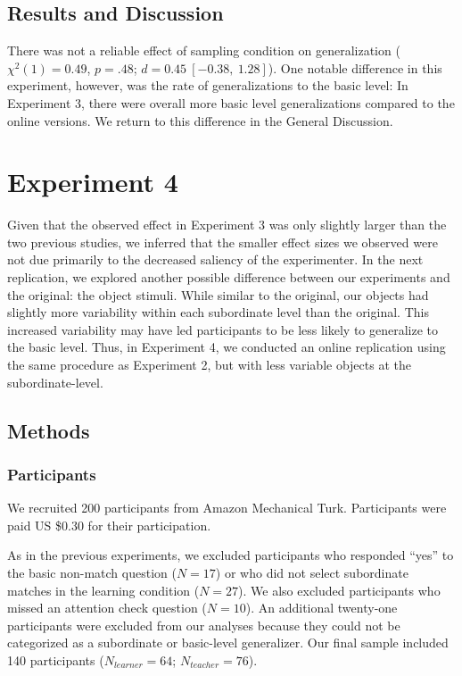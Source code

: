 \documentclass[man]{apa2}
\begin{document}
\subsection{Results and Discussion}

There was not a reliable effect of sampling condition on generalization ($\chi^2(1) = 0.49$, $p = .48$; $d = 0.45\ [-0.38,\ 1.28]$). One notable difference in this experiment, however, was the rate of generalizations to the basic level: In Experiment 3, there were overall more basic level generalizations compared to the online versions. We return to this difference in the General Discussion.

\section{Experiment 4}
Given that the observed effect in Experiment 3 was only slightly larger than the two previous studies, we inferred that the smaller effect sizes we observed were not due primarily to the decreased saliency of the experimenter. In the next replication, we explored another possible difference between our experiments and the original: the object stimuli. While similar to the original, our objects had slightly more variability within each subordinate level than the original. This increased variability may have led participants to be less likely to generalize to the basic level. Thus, in Experiment 4, we conducted an online replication using the same procedure as Experiment 2, but with less variable objects at the subordinate-level. 

\subsection{Methods}

\subsubsection{Participants}  

We recruited 200 participants from Amazon Mechanical Turk. Participants were paid US \$0.30 for their participation.

As in the previous experiments, we excluded participants who responded ``yes'' to the basic non-match question ($N=17$) or who did not select subordinate matches in the learning condition ($N = 27$). We also excluded participants who missed an attention check question ($N = 10$). An additional twenty-one participants were excluded from our analyses because they could not be categorized as a subordinate or basic-level generalizer.  Our final sample included 140 participants ($N_{learner} = 64$; $N_{teacher} = 76$). 
\end{document}
